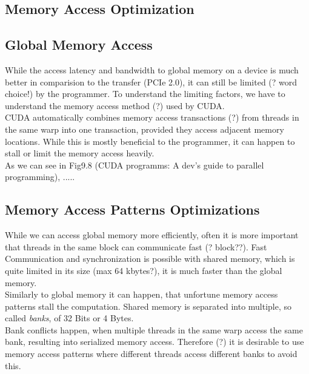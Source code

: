 \subsection{Memory Access Optimization}
\label{sec:access}
\subsection{Global Memory Access}
While the access latency and bandwidth to global memory on a device is much better in comparision to the transfer (PCIe 2.0),
it can still be limited (? word choice!) by the programmer.
To understand the limiting factors, we have to understand the memory access method (?) used by CUDA.\\
CUDA automatically combines memory access transactions (?) from threads in the same warp into one transaction, provided they access adjacent memory locations.
While this is mostly beneficial to the programmer, it can happen to stall or limit the memory access heavily.\\
As we can see in Fig9.8 (CUDA programms: A dev's guide to parallel programming), .....
\subsection{Memory Access Patterns Optimizations}
While we can access global memory more efficiently, often it is more important that threads in the same block can communicate fast (? block??).
Fast Communication and synchronization is possible with shared memory, which is quite limited in its size (max 64 kbytes?), it is much faster than the global memory.\\
Similarly to global memory it can happen, that unfortune memory access patterns stall the computation.
Shared memory is separated into multiple, so called \emph{banks}, of 32 Bits or 4 Bytes.\\
Bank conflicts happen, when multiple threads in the same warp access the same bank, resulting into serialized memory access.
Therefore (?) it is desirable to use memory access patterns where different threads access different banks to avoid this.
